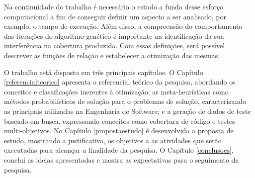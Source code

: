 Na continuidade do trabalho é necessário o estudo a fundo desse esforço computacional a fim de conseguir definir um aspecto a ser analisado, por exemplo, o tempo de execução. Além disso, a compreensão do comportamento das iterações do algoritmo genético é importante na identificação da sua interferência na cobertura produzida. Com essas definições, será possível descrever as funções de relação e estabelecer a otimização das mesmas. 

O trabalho está disposto em três principais capítulos. O Capítulo \ref{referencialteorico} apresenta o referencial teórico da pesquisa, abordando os conceitos e classificações inerentes à otimização; as meta-heurísticas como métodos probabilísticos de solução para o problemas de solução, caracterizando as principais utilizadas na Engenharia de Software; e a geração de dados de teste baseado em busca, expressando conceitos como cobertura de código e testes multi-objetivos. No Capítulo \ref{propostaestudo} é desenvolvida a proposta de estudo, mostrando a justificativa, os objetivos a as atividades que serão executadas para alcançar a finalidade da pesquisa. O Capítulo \ref{conclusoes}, conclui as ideias apresentadas e mostra as expectativas para o seguimento da pesquisa.
